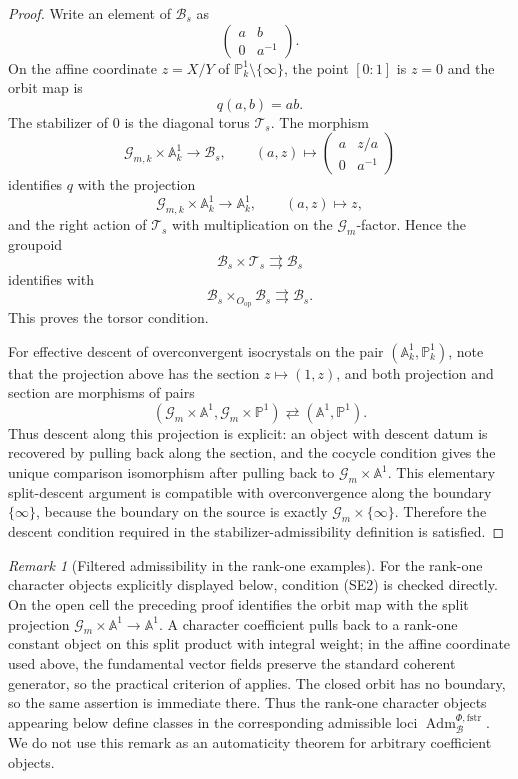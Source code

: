 \documentclass[11pt]{amsart}
\theoremstyle{plain}
\theoremstyle{definition}
\theoremstyle{remark}
\newtheorem{remark}{Remark}[section]
\newcommand{\fstr}{\mathrm{fstr}}
\newcommand{\Adm}{\operatorname{Adm}}
\begin{document}
\begin{proof}
Write an element of \(\mathcal B_s\) as
\[
  \begin{pmatrix} a&b\\0&a^{-1}\end{pmatrix}.
\]
On the affine coordinate \(z=X/Y\) of
\(\mathbb P^1_k\setminus\{\infty\}\), the point \([0:1]\) is \(z=0\) and the
orbit map is
\[
  q(a,b)=ab.
\]
The stabilizer of \(0\) is the diagonal torus \(\mathcal T_s\).  The morphism
\[
  \mathcal G_{m,k}\times\mathbb A^1_k\longrightarrow\mathcal B_s,
  \qquad
  (a,z)\longmapsto
  \begin{pmatrix}a&z/a\\0&a^{-1}\end{pmatrix}
\]
identifies \(q\) with the projection
\[
  \mathcal G_{m,k}\times\mathbb A^1_k\longrightarrow\mathbb A^1_k,
  \qquad (a,z)\longmapsto z,
\]
and the right action of \(\mathcal T_s\) with multiplication on the
\(\mathcal G_m\)-factor.  Hence the groupoid
\[
  \mathcal B_s\times\mathcal T_s\rightrightarrows\mathcal B_s
\]
identifies with
\[
  \mathcal B_s\times_{O_{\mathrm{op}}}\mathcal B_s
  \rightrightarrows \mathcal B_s.
\]
This proves the torsor condition.

For effective descent of overconvergent isocrystals on the pair
\((\mathbb A^1_k,\mathbb P^1_k)\), note that the projection above has the
section \(z\mapsto(1,z)\), and both projection and section are morphisms of
pairs
\[
  (\mathcal G_m\times\mathbb A^1,\mathcal G_m\times\mathbb P^1)
  \rightleftarrows
  (\mathbb A^1,\mathbb P^1).
\]
Thus descent along this projection is explicit: an object with descent datum
is recovered by pulling back along the section, and the cocycle condition gives
the unique comparison isomorphism after pulling back to
\(\mathcal G_m\times\mathbb A^1\).  This elementary split-descent argument is
compatible with overconvergence along the boundary \(\{\infty\}\), because the
boundary on the source is exactly \(\mathcal G_m\times\{\infty\}\).  Therefore
the descent condition required in the stabilizer-admissibility definition is
satisfied.
\end{proof}

\begin{remark}[Filtered admissibility in the rank-one examples]
\label{rem:SL2-SE2}
For the rank-one character objects explicitly displayed below, condition
\textup{(SE2)} is checked directly.  On the open cell the preceding proof
identifies the orbit map with the split projection
\(\mathcal G_m\times\mathbb A^1\to\mathbb A^1\).  A character coefficient pulls
back to a rank-one constant object on this split product with integral weight;
in the affine coordinate used above, the fundamental vector fields preserve the
standard coherent generator, so the practical criterion of
 applies.  The closed orbit has no boundary,
so the same assertion is immediate there.  Thus the rank-one character objects
appearing below define classes in the corresponding admissible loci
\(\Adm^{\Phi,\fstr}_{\mathcal B}\).  We do not use this remark as an automaticity
theorem for arbitrary coefficient objects.
\end{remark}
\end{document}
